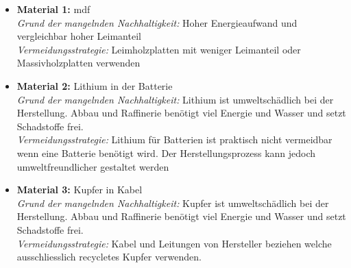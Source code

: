 \begin{itemize}
    \item \textbf{Material 1:} \acrfull{mdf} \\
          \textit{Grund der mangelnden Nachhaltigkeit:} Hoher Energieaufwand und vergleichbar hoher Leimanteil  \\
          \textit{Vermeidungsstrategie:} Leimholzplatten mit weniger Leimanteil oder Massivholzplatten verwenden
          
    \item \textbf{Material 2:} Lithium in der Batterie \\
          \textit{Grund der mangelnden Nachhaltigkeit:} Lithium ist umweltschädlich bei der Herstellung. Abbau und Raffinerie benötigt viel Energie und Wasser und setzt Schadstoffe frei. \\
          \textit{Vermeidungsstrategie:} Lithium für Batterien ist praktisch nicht vermeidbar wenn eine Batterie benötigt wird. Der Herstellungsprozess kann jedoch umweltfreundlicher gestaltet werden
          
    \item \textbf{Material 3:} Kupfer in Kabel \\
          \textit{Grund der mangelnden Nachhaltigkeit:} Kupfer ist umweltschädlich bei der Herstellung. Abbau und Raffinerie benötigt viel Energie und Wasser und setzt Schadstoffe frei. \\
          \textit{Vermeidungsstrategie:} Kabel und Leitungen von Hersteller beziehen welche ausschliesslich recycletes Kupfer verwenden.
\end{itemize}